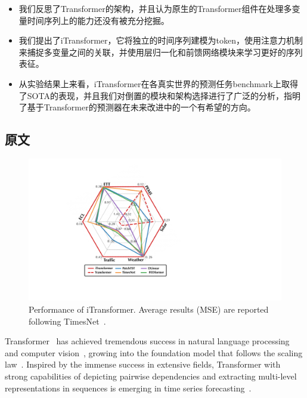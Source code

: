 \documentclass[twoside,12pt]{article}
\begin{document}
\begin{itemize}
  \item 我们反思了Transformer的架构，并且认为原生的Transformer组件在处理多变量时间序列上的能力还没有被充分挖掘。
  \item 我们提出了iTransformer，它将独立的时间序列建模为token，使用注意力机制来捕捉多变量之间的关联，并使用层归一化和前馈网络模块来学习更好的序列表征。
  \item 从实验结果上来看，iTransformer在各真实世界的预测任务benchmark上取得了SOTA的表现，并且我们对倒置的模块和架构选择进行了广泛的分析，指明了基于Transformer的预测器在未来改进中的一个有希望的方向。
\end{itemize}

\subsection{原文}

\begin{figure}[t]
  \begin{center}
    \includegraphics[width=0.5\columnwidth]{pic/radar.pdf}
    \vspace{-10pt}
    \caption{\small{Performance of iTransformer. Average results (MSE) are reported following TimesNet~\citeyearpar{Timesnet}}.}
    \label{fig:radar}
  \end{center}
  \vspace{-14pt}
\end{figure}


Transformer~\citep{Transformer} has achieved tremendous success in natural language processing~\citep{brown2020language} and computer vision~\citep{dosovitskiy2020image}, growing into the foundation model that follows the scaling law~\citep{kaplan2020scaling}. Inspired by the immense success in extensive fields, Transformer with strong capabilities of depicting pairwise dependencies and extracting multi-level representations in sequences is emerging in time series forecasting~\citep{Informer, Autoformer, PatchTST}.
\end{document}
